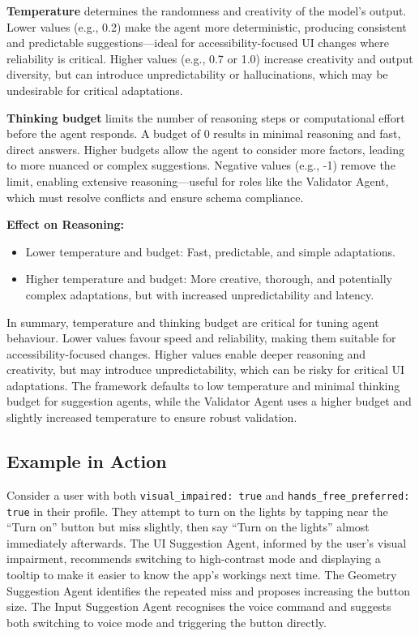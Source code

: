 \documentclass[openany]{book}
\begin{document}
\textbf{Temperature} determines the randomness and creativity of the model’s output. Lower values (e.g., 0.2) make the agent more deterministic, producing consistent and predictable suggestions—ideal for accessibility-focused UI changes where reliability is critical. Higher values (e.g., 0.7 or 1.0) increase creativity and output diversity, but can introduce unpredictability or hallucinations, which may be undesirable for critical adaptations.

\textbf{Thinking budget} limits the number of reasoning steps or computational effort before the agent responds. A budget of 0 results in minimal reasoning and fast, direct answers. Higher budgets allow the agent to consider more factors, leading to more nuanced or complex suggestions. Negative values (e.g., -1) remove the limit, enabling extensive reasoning—useful for roles like the Validator Agent, which must resolve conflicts and ensure schema compliance.

\textbf{Effect on Reasoning:}
\begin{itemize}
    \item Lower temperature and budget: Fast, predictable, and simple adaptations.
    \item Higher temperature and budget: More creative, thorough, and potentially complex adaptations, but with increased unpredictability and latency.
\end{itemize}

In summary, temperature and thinking budget are critical for tuning agent behaviour. Lower values favour speed and reliability, making them suitable for accessibility-focused changes. Higher values enable deeper reasoning and creativity, but may introduce unpredictability, which can be risky for critical UI adaptations. The framework defaults to low temperature and minimal thinking budget for suggestion agents, while the Validator Agent uses a higher budget and slightly increased temperature to ensure robust validation.

\subsection{Example in Action}
Consider a user with both \texttt{visual\_impaired: true} and \texttt{hands\_free\_preferred: true} in their profile. They attempt to turn on the lights by tapping near the “Turn on” button but miss slightly, then say “Turn on the lights” almost immediately afterwards. The UI Suggestion Agent, informed by the user’s visual impairment, recommends switching to high-contrast mode and displaying a tooltip to make it easier to know the app's workings next time. The Geometry Suggestion Agent identifies the repeated miss and proposes increasing the button size. The Input Suggestion Agent recognises the voice command and suggests both switching to voice mode and triggering the button directly.
\end{document}
